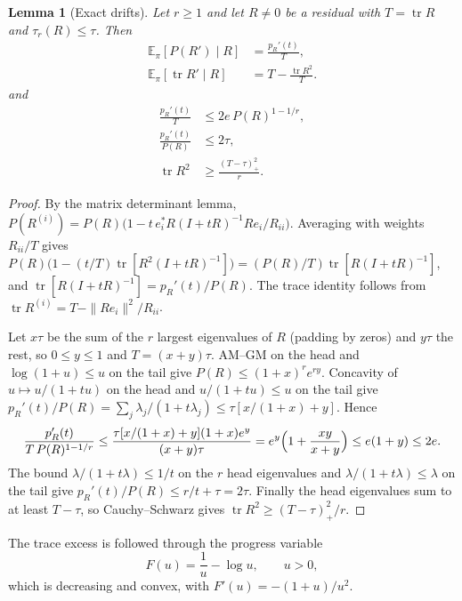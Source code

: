 \documentclass[11pt]{article}
\newtheorem{lemma}[theorem]{Lemma}
\theoremstyle{definition}\newtheorem{definition}[theorem]{Definition}
\theoremstyle{remark}\newtheorem{remark}[theorem]{Remark}
\newcommand{\E}{\mathbb E}
\newcommand{\tr}{\operatorname{tr}}
\newcommand{\1}{\mathbf 1}
\begin{document}
\begin{lemma}[Exact drifts]\label{lem:drifts}
Let $r\ge1$ and let $R\ne0$ be a residual with $T=\tr R$ and
$\tau_r(R)\le\tau$. Then
\begin{equation}\label{eq:exactdrifts}
 \begin{aligned}
 \E_\pi[P(R')\mid R]&=\frac{p_R'(t)}T,\\
 \E_\pi[\tr R'\mid R]&=T-\frac{\tr R^2}T.
 \end{aligned}
\end{equation}
and
\begin{equation}\label{eq:driftbounds}
 \begin{aligned}
 \frac{p_R'(t)}{T}&\le 2e\,P(R)^{1-1/r},\\
 \frac{p_R'(t)}{P(R)}&\le2\tau,\\
 \tr R^2&\ge\frac{(T-\tau)_+^2}r .
 \end{aligned}
\end{equation}
\end{lemma}
\begin{proof}
By the matrix determinant lemma,
$P(R^{(i)})=P(R)\bigl(1-t\,e_i^*R(I+tR)^{-1}Re_i/R_{ii}\bigr)$. Averaging
with weights $R_{ii}/T$ gives
$P(R)\bigl(1-(t/T)\tr[R^2(I+tR)^{-1}]\bigr)=(P(R)/T)\tr[R(I+tR)^{-1}]$,
and $\tr[R(I+tR)^{-1}]=p_R'(t)/P(R)$. The trace identity follows from
$\tr R^{(i)}=T-\|Re_i\|^2/R_{ii}$.

Let $x\tau$ be the sum of the $r$ largest eigenvalues of $R$ (padding
by zeros) and $y\tau$ the rest, so $0\le y\le1$ and $T=(x+y)\tau$.
AM--GM on the head and $\log(1+u)\le u$ on the tail give
$P(R)\le(1+x)^re^{ry}$. Concavity of $u\mapsto u/(1+tu)$ on the head
and $u/(1+tu)\le u$ on the tail give
$p_R'(t)/P(R)=\sum_j\lambda_j/(1+t\lambda_j)\le\tau[x/(1+x)+y]$. Hence
\[
 \frac{p_R'(t)}{T\,P(R)^{1-1/r}}
 \le\frac{\tau[x/(1+x)+y](1+x)e^y}{(x+y)\tau}
 =e^y\Bigl(1+\frac{xy}{x+y}\Bigr)\le e(1+y)\le2e .
\]
The bound $\lambda/(1+t\lambda)\le1/t$ on the $r$ head eigenvalues and
$\lambda/(1+t\lambda)\le\lambda$ on the tail give $p_R'(t)/P(R)\le
r/t+\tau=2\tau$. Finally the head eigenvalues sum to at least $T-\tau$,
so Cauchy--Schwarz gives $\tr R^2\ge(T-\tau)_+^2/r$.
\end{proof}

The trace excess is followed through the progress variable
\begin{equation}\label{eq:F}
 F(u)=\frac1u-\log u,\qquad u>0,
\end{equation}
which is decreasing and convex, with $F'(u)=-(1+u)/u^2$.
\end{document}

